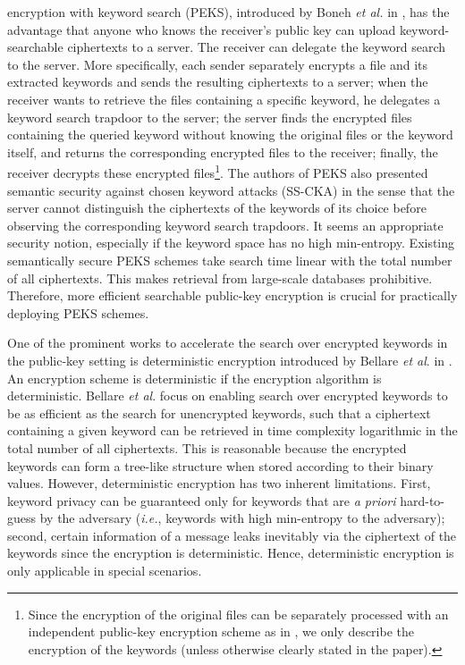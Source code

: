 \documentclass[10pt,twocolumn,twoside]{IEEEtran}
\begin{document}
 encryption with keyword search (PEKS), introduced by Boneh \emph{et al.} in \cite{BCO04}, has the advantage that anyone who knows the receiver's public key can upload keyword-searchable ciphertexts to a server. The receiver can delegate the keyword search to the server. More
specifically, each sender separately encrypts a file and its extracted keywords and sends the resulting ciphertexts to a server; when the receiver wants to retrieve the files containing a specific keyword, he delegates a keyword search trapdoor to the server; the server finds the encrypted files containing the queried keyword without knowing the original files or the keyword itself, and returns the corresponding encrypted files to the receiver; finally, the receiver decrypts these encrypted files\footnote{Since the encryption of the original files can be separately processed with an independent public-key encryption scheme as in \cite{BCO04}, we only describe the encryption of the keywords (unless otherwise
clearly stated in the paper).}. The authors of PEKS \cite{BCO04} also presented semantic security against chosen keyword attacks (SS-CKA) in the sense that the server cannot distinguish the ciphertexts of the keywords of its choice before observing the corresponding keyword search trapdoors. It seems an appropriate security notion, especially if the keyword space has no high min-entropy. Existing semantically secure PEKS schemes take search time linear with the total number of all ciphertexts. This makes retrieval from large-scale databases prohibitive. Therefore, more efficient searchable public-key encryption is crucial for practically deploying PEKS schemes.

One of the prominent works to accelerate the search over encrypted keywords in the public-key setting is deterministic
encryption introduced by Bellare \emph{et al}. in \cite{BBN07}. An encryption scheme is deterministic if the encryption algorithm is deterministic. Bellare \emph{et al}. \cite{BBN07} focus on enabling search over encrypted keywords to be
as efficient as the search for unencrypted keywords, such that a ciphertext containing a given keyword can be retrieved
in time complexity logarithmic in the total number of all ciphertexts. This is reasonable because the encrypted keywords
can form a tree-like structure when stored according to their binary values. However, deterministic encryption has two inherent limitations. First, keyword privacy can be guaranteed only
for keywords that are \emph{a priori} hard-to-guess by the adversary (\emph{i.e.}, keywords with high
min-entropy to the adversary); second, certain information of a message leaks inevitably via the ciphertext of
the keywords since the encryption is deterministic. Hence, deterministic encryption is only applicable in special scenarios.
\end{document}
